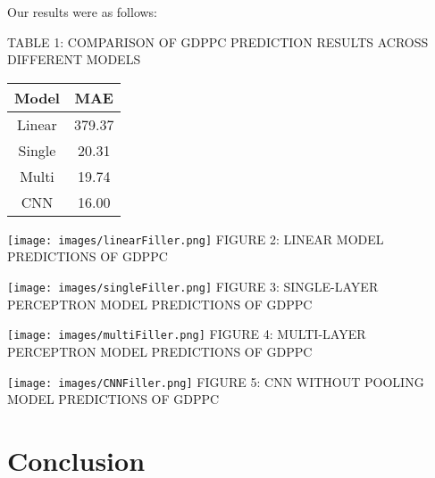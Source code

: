 \documentclass[final]{cvpr}
\begin{document}
    Our results were as follows:

    \begin{center}

        {\small 
            TABLE 1: COMPARISON OF GDPPC PREDICTION RESULTS ACROSS DIFFERENT
            MODELS
        }

        \begin{tabular}{||c c||}
             \hline
             Model & MAE\\ [0.5ex]
             \hline\hline
             Linear &  379.37 \\
             \hline
             Single & 20.31 \\
             \hline
             Multi & 19.74 \\
             \hline
             CNN & 16.00 \\
             \hline
        \end{tabular}
        
        \vspace{24pt}

        \texttt{[image: images/linearFiller.png]}
        {\small
            FIGURE 2: LINEAR MODEL PREDICTIONS OF GDPPC
        }

        \texttt{[image: images/singleFiller.png]}
        {\small
            FIGURE 3: SINGLE-LAYER PERCEPTRON MODEL PREDICTIONS OF GDPPC
        }

        \texttt{[image: images/multiFiller.png]}
        {\small
            FIGURE 4: MULTI-LAYER PERCEPTRON MODEL PREDICTIONS OF GDPPC
        }

        \texttt{[image: images/CNNFiller.png]}
        {\small
            FIGURE 5: CNN WITHOUT POOLING MODEL PREDICTIONS OF GDPPC
        }
    \end{center}



\section{Conclusion}
\end{document}
